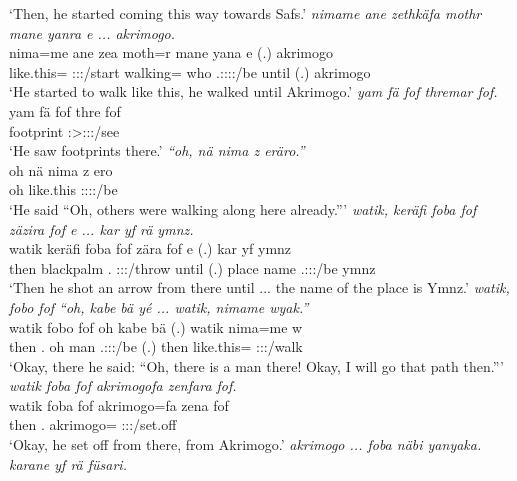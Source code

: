 \begin{exe}
	\trans `Then, he started coming this way towards Safs.'
	\emph{nimame ane zethkäfa mothr mane yanra e ... akrimogo.}\\
	\gll nima=me ane zea moth=r mane yana e (.) akrimogo\\ 
	like.this={\Ins} {\Dem} \Sg:\Sbj:\Pst:\Pfv/start walking={\Purp} who \Tsg.\Masc:\Sbj:\Pst:\Ipfv:\Venit/be until (.) akrimogo\\
	\trans `He started to walk like this, he walked until Akrimogo.'
	\emph{yam fä fof thremar fof.}\\
	\gll yam fä fof thre fof\\ 
	footprint {\Dist} {\Emph} \Stsg:\Sbj>\Stpl:\Obj:\Irr:\Pfv/see {\Emph}\\
	\trans `He saw footprints there.'
	\emph{``oh, nä nima z eräro.''}\\
	\gll oh nä nima z ero\\ 
	oh {\Indf} like.this {\Iam} \Stpl:\Sbj:\Nonpast:\Ipfv:\Andat/be\\
	\trans `He said ``Oh, others were walking along here already.'''
	\emph{watik, keräfi foba fof zäzira fof e ... kar yf rä ymnz.}\\
	\gll watik keräfi foba fof zära fof e (.) kar yf  ymnz\\ 
	then blackpalm \Dist.{\Abl} {\Emph} \Sg:\Sbj:\Pst:\Pfv/throw {\Emph} until (.) place name \Tsg.\F:\Sbj:\Nonpast:\Ipfv/be ymnz\\
	\trans `Then he shot an arrow from there until ... the name of the place is Ymnz.'
	\emph{watik, fobo fof ``oh, kabe bä yé ... watik, nimame wyak.''}\\
	\gll watik fobo fof oh kabe bä  (.) watik nima=me w\\ 
	then \Dist.{\All} {\Emph} oh man \Med{} \Tsg.\Masc:\Sbj:\Nonpast:\Ipfv/be (.) then like.this={\Ins} \Fsg:\Sbj:\Nonpast:\Ipfv/walk\\
	\trans `Okay, there he said: ``Oh, there is a man there! Okay, I will go that path then.'''
	\emph{watik foba fof akrimogofa zenfara fof.}\\
	\gll watik foba fof akrimogo=fa zena fof\\ 
	then \Dist.{\Abl} {\Emph} akrimogo={\Abl} \Sg:\Sbj:\Pst:\Pfv/set.off {\Emph}\\
	\trans `Okay, he set off from there, from Akrimogo.'
	\emph{akrimogo ... foba näbi yanyaka. karane yf rä füsari.}\\

\end{exe}
